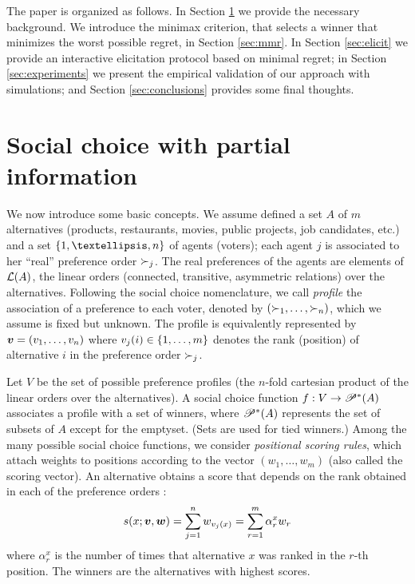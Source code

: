 The paper is organized as follows.
In Section \ref{sec:background} we provide the necessary background.
We introduce the minimax criterion, that selects a winner that minimizes the worst possible regret, in Section \ref{sec:mmr}.
In Section \ref{sec:elicit} we provide an interactive elicitation protocol based on minimal regret;  in Section \ref{sec:experiments} we present the empirical validation of our approach with simulations; and Section \ref{sec:conclusions} provides some final thoughts.

\section{Social choice with partial information}\label{sec:background}
We now introduce some basic concepts.
We assume defined a set $A$ of $m$ alternatives (products, restaurants, movies, public projects, job candidates, etc.) and a set $\set{1, …, n}$ of agents (voters); each agent $j$ is associated to her “real” preference order $\succ_j$.
The real preferences of the agents are elements of $\mathcal{L}(A)$, the linear orders (connected, transitive, asymmetric relations) over the alternatives.
Following the social choice nomenclature, we call {\em profile} the association of a preference to each voter, denoted by $(\succ_1,\ldots,\succ_n)$, which we assume is fixed but unknown.
The profile is equivalently represented by $\bm{v}=(v_1,\ldots,v_n)$ where $v_j(i) \in \{1, \ldots, m\}$ denotes the rank (position) of alternative $i$ in the preference order $\succ_j$. 

Let $V$ be the set of possible preference profiles (the $n$-fold cartesian product of the linear orders over the alternatives).
A social choice function $f : V \rightarrow \mathscr{P}^*(A)$ associates a profile with a set of winners, where $\mathscr{P}^*(A)$ represents the set of subsets of $A$ except for the emptyset. (Sets are used for tied winners.)
Among the many possible social choice functions, we consider {\em positional scoring rules}, which attach weights to positions according to  the vector $(w_1, \ldots, w_m)$ (also called the scoring vector).
An alternative obtains a score that depends on the rank obtained in each of the preference orders :
\begin{align}
\label{eq:srule}
s(x; \bm{v}, \bm{w}) = \sum_{j=1}^{n} w_{v_j(x)}
= \sum_{r=1}^{m} \alpha^{x}_r w_r 
\end{align}
where $\alpha^{x}_r$ is the number of times that alternative $x$ was ranked in the $r$-th position.
The winners are the alternatives with highest scores.

